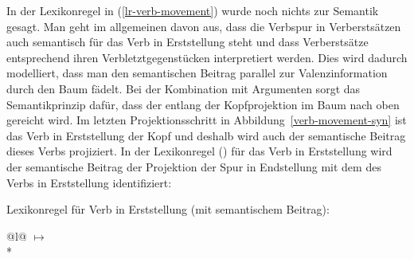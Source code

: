 In der Lexikonregel in (\ref{lr-verb-movement}) wurde noch nichts zur Semantik gesagt. Man geht im allgemeinen davon aus, dass
die Verbspur in Verberstsätzen auch semantisch für das Verb in Erststellung steht und
dass Verberstsätze entsprechend ihren Verbletztgegenstücken interpretiert werden. Dies
wird dadurch modelliert, dass man den semantischen Beitrag parallel zur Valenzinformation
durch den Baum fädelt. 
Bei der Kombination mit Argumenten sorgt das Semantikprinzip dafür, 
dass der \contw entlang der Kopfprojektion im Baum nach
oben gereicht wird. Im letzten Projektionsschritt in Abbildung~\ref{verb-movement-syn}
ist das Verb in Erststellung der Kopf und deshalb wird auch der semantische Beitrag
dieses Verbs projiziert. In der Lexikonregel () für das Verb in Erststellung wird
der semantische Beitrag der Projektion der Spur in Endstellung  mit
dem \contw des Verbs in Erststellung identifiziert:

\eas
\label{lr-verb-movement2}
Lexikonregel für Verb in Erststellung (mit semantischem Beitrag):\\
\begin{tabular}[t]{@{}l@{}}
 $\mapsto$\\*
\end{tabular}
\zs

